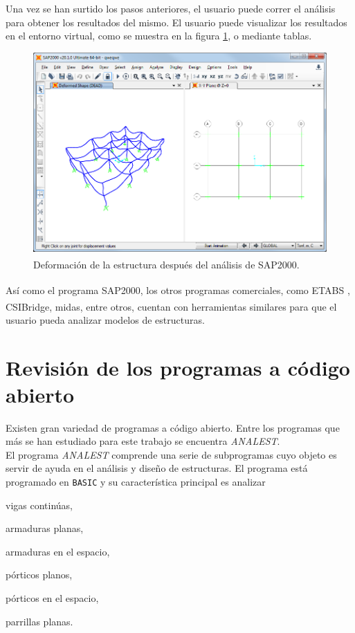 Una vez se han surtido los pasos anteriores, el usuario puede correr el análisis para obtener los resultados del mismo. El usuario puede visualizar los resultados en el entorno virtual, como se muestra en la figura \ref{fig:sap2000_deformed}, o mediante tablas.
\begin{figure}[ht]
    \centering
    \includegraphics[width=1\textwidth]{metodologia/sap2000_deformed.png}
    \caption{Deformación de la estructura después del análisis de SAP2000\textsuperscript{\textregistered}.}
    \label{fig:sap2000_deformed}
\end{figure}

Así como el programa SAP2000\textsuperscript{\textregistered}, los otros programas comerciales, como ETABS \textsuperscript{\textregistered}, CSIBridge\textsuperscript{\textregistered}, midas\textsuperscript{\textregistered}, entre otros, cuentan con herramientas similares para que el usuario pueda analizar modelos de estructuras.

\section{Revisión de los programas a código abierto}
Existen gran variedad de programas a código abierto. Entre los programas que más se han estudiado para este trabajo se encuentra \textit{ANALEST}. \\

El programa \textit{ANALEST} comprende una serie de subprogramas cuyo objeto es servir de ayuda en el análisis y diseño de estructuras. El programa está programado en \texttt{BASIC} y su característica principal es analizar 
\begin{inparaenum}[$ (1) $]
    \item vigas continúas, 
    \item armaduras planas, 
    \item armaduras en el espacio, 
    \item pórticos planos, 
    \item pórticos en el espacio, 
    \item parrillas planas.
\end{inparaenum}

